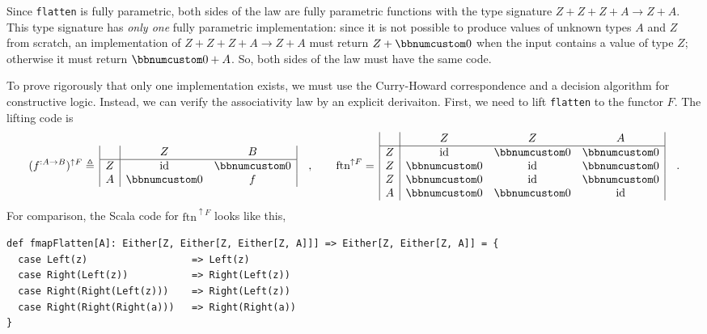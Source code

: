 Since \lstinline!flatten! is fully parametric, both sides of the
law are fully parametric functions with the type signature $Z+Z+Z+A\rightarrow Z+A$.
This type signature has \emph{only one} fully parametric implementation:
since it is not possible to produce values of unknown types $A$ and
$Z$ from scratch, an implementation of $Z+Z+Z+A\rightarrow Z+A$
must return $Z+\bbnum 0$ when the input contains a value of type
$Z$; otherwise it must return $\bbnum 0+A$. So, both sides of the
law must have the same code.

To prove rigorously that only one implementation exists, we must use
the Curry-Howard correspondence and a decision algorithm for constructive
logic. Instead, we can verify the associativity law by an explicit
derivaiton. First, we need to lift \lstinline!flatten! to the functor
$F$. The lifting code is
\[
(f^{:A\rightarrow B})^{\uparrow F}\triangleq\,\begin{array}{|c|cc|}
 & Z & B\\
\hline Z & \text{id} & \bbnum 0\\
A & \bbnum 0 & f
\end{array}\quad,\quad\quad\text{ftn}^{\uparrow F}=\,\begin{array}{|c|ccc|}
 & Z & Z & A\\
\hline Z & \text{id} & \bbnum 0 & \bbnum 0\\
Z & \bbnum 0 & \text{id} & \bbnum 0\\
Z & \bbnum 0 & \text{id} & \bbnum 0\\
A & \bbnum 0 & \bbnum 0 & \text{id}
\end{array}\quad.
\]
For comparison, the Scala code for $\text{ftn}^{\uparrow F}$ looks
like this,
\begin{lstlisting}
def fmapFlatten[A]: Either[Z, Either[Z, Either[Z, A]]] => Either[Z, Either[Z, A]] = {
  case Left(z)                  => Left(z)
  case Right(Left(z))           => Right(Left(z))
  case Right(Right(Left(z)))    => Right(Left(z))
  case Right(Right(Right(a)))   => Right(Right(a))
}
\end{lstlisting}

